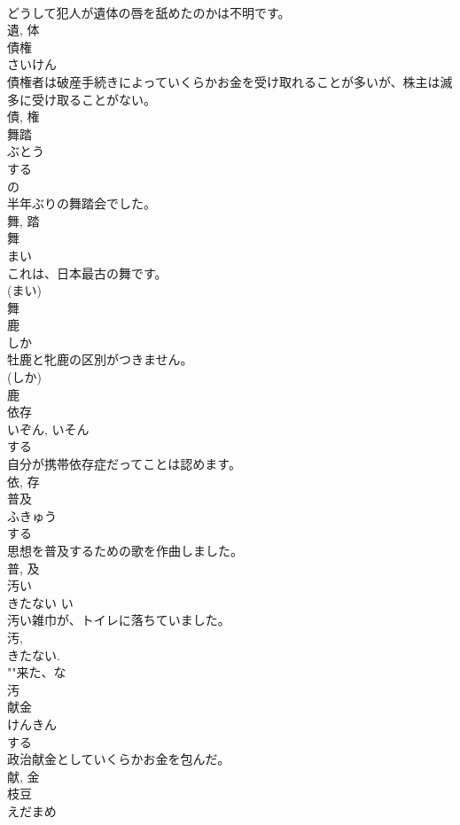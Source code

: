 \documentclass[8pt]{extreport}
\begin{document}
\begin{CJK}{UTF8}{min}
\\	どうして犯人が遺体の唇を舐めたのかは不明です。	
\\	遺, 体	
\\	債権	
\\	さいけん	
\\	債権者は破産手続きによっていくらかお金を受け取れることが多いが、株主は滅多に受け取ることがない。	
\\	債, 権	
\\	舞踏	
\\	ぶとう	
\\	する 
\\	の 
\\	半年ぶりの舞踏会でした。	
\\	舞, 踏	
\\	舞	
\\	まい	
\\	これは、日本最古の舞です。	
\\	(まい) 
\\	舞	
\\	鹿	
\\	しか	
\\	牡鹿と牝鹿の区別がつきません。	
\\	(しか) 
\\	鹿	
\\	依存	
\\	いぞん, いそん	
\\	する 
\\	自分が携帯依存症だってことは認めます。	
\\	依, 存	
\\	普及	
\\	ふきゅう	
\\	する 
\\	思想を普及するための歌を作曲しました。	
\\	普, 及	
\\	汚い	
\\	きたない	い 
\\	汚い雑巾が、トイレに落ちていました。	
\\	汚, 
\\	きたない. 
\\	""来た、な
\\	汚	
\\	献金	
\\	けんきん	
\\	する 
\\	政治献金としていくらかお金を包んだ。	
\\	献, 金	
\\	枝豆	
\\	えだまめ	

\end{CJK}
\end{document}
